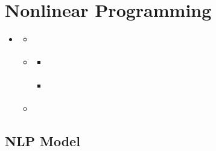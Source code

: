 \documentclass[letterpaper,10pt,english]{sphinxmanual}
\begin{document}
\chapter{Nonlinear Programming}
\label{\detokenize{operationsResearch/NLP:nonlinear-programming}}\label{\detokenize{operationsResearch/NLP::doc}}
\begin{sphinxShadowBox}
\begin{itemize}
\item {} 
\sphinxAtStartPar
{}\label{\detokenize{operationsResearch/NLP:id1}}{\hyperref[\detokenize{operationsResearch/NLP:nonlinear-programming}]{}}
\begin{itemize}
\item {} 
\sphinxAtStartPar
{}\label{\detokenize{operationsResearch/NLP:id2}}{\hyperref[\detokenize{operationsResearch/NLP:nlp-model}]{}}

\item {} 
\sphinxAtStartPar
{}\label{\detokenize{operationsResearch/NLP:id3}}{\hyperref[\detokenize{operationsResearch/NLP:solution-methods}]{}}
\begin{itemize}
\item {} 
\sphinxAtStartPar
{}\label{\detokenize{operationsResearch/NLP:id4}}{\hyperref[\detokenize{operationsResearch/NLP:gradient-descent}]{}}

\item {} 
\sphinxAtStartPar
{}\label{\detokenize{operationsResearch/NLP:id5}}{\hyperref[\detokenize{operationsResearch/NLP:newton-s-method}]{}}

\end{itemize}

\item {} 
\sphinxAtStartPar
{}\label{\detokenize{operationsResearch/NLP:id6}}{\hyperref[\detokenize{operationsResearch/NLP:applications}]{}}

\end{itemize}

\end{itemize}
\end{sphinxShadowBox}


\section{NLP Model}
\label{\detokenize{operationsResearch/NLP:nlp-model}}
\end{document}
